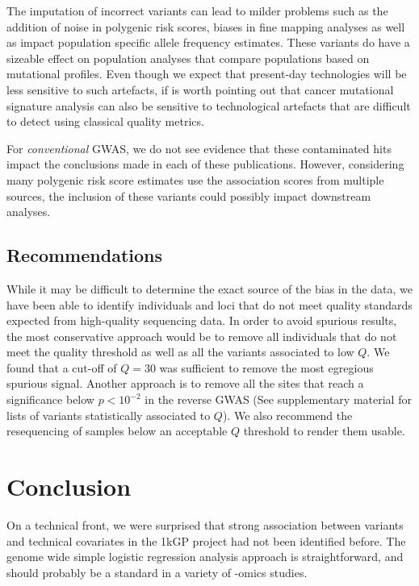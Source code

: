 \documentclass[9pt,lineno]{elife}
\begin{document}
The imputation of incorrect variants can lead to milder problems such as the addition of noise in polygenic risk scores, biases in fine mapping analyses as well as impact population specific allele frequency estimates.
These variants do have a sizeable effect on population analyses that compare populations based on mutational profiles. 
Even though we expect that present-day technologies will be less sensitive to such artefacts, if is worth pointing out that cancer mutational signature analysis can also be sensitive to technological artefacts that are difficult to detect using classical quality metrics. 

For \textit{conventional} GWAS, we do not see evidence that these contaminated hits impact the conclusions made in each of these publications.
However, considering many polygenic risk score estimates use the association scores from multiple sources, the inclusion of these variants could possibly impact downstream analyses.  

\subsection{Recommendations}
While it may be difficult to determine the exact source of the bias in the data, we have been able to identify individuals and loci that do not meet quality standards expected from high-quality sequencing data.
In order to avoid spurious results, the most conservative approach would be to remove all individuals that do not meet the quality threshold as well as all the variants associated to low $Q$.
We found that a cut-off of $Q = 30$ was sufficient to remove the most egregious spurious signal.
Another approach is to remove all the sites that reach a significance below $ p < 10^{-2}$ in the reverse GWAS (See supplementary material for lists of variants statistically associated to $Q$).
We also recommend the resequencing of samples below an acceptable $Q$ threshold to render them usable.

\section{Conclusion}

On a technical front, we were surprised that strong association between variants and technical covariates in the 1kGP project had not been identified before. 
The genome wide simple logistic regression analysis approach is straightforward, and should probably be a standard in a variety of -omics studies. 
\end{document}
